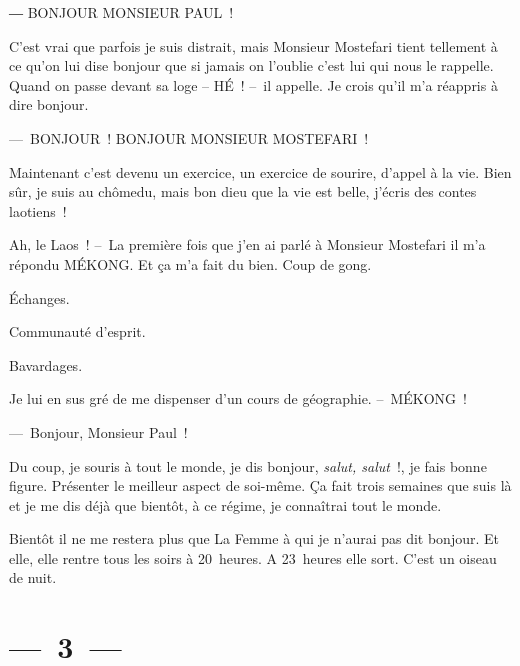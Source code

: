 \documentclass[french,twoside]{book} %
\begin{document}
― BONJOUR MONSIEUR PAUL !\par
C’est vrai que parfois je suis distrait, mais Monsieur Mostefari tient tellement à ce qu’on lui dise bonjour que si jamais on l’oublie c’est lui qui nous le rappelle. Quand on passe devant sa loge – HÉ ! – il appelle. Je crois qu’il m’a réappris à dire bonjour.\par
— BONJOUR ! BONJOUR MONSIEUR MOSTEFARI !\par
Maintenant c’est devenu un exercice, un exercice de sourire, d’appel à la vie. Bien sûr, je suis au chômedu, mais bon dieu que la vie est belle, j’écris des contes laotiens !\par
Ah, le Laos ! – La première fois que j’en ai parlé à Monsieur Mostefari il m’a répondu MÉKONG. Et ça m’a fait du bien. Coup de gong.\par
Échanges.\par
Communauté d’esprit.\par
Bavardages.\par
Je lui en sus gré de me dispenser d’un cours de géographie. – MÉKONG !\par
— Bonjour, Monsieur Paul !\par
Du coup, je souris à tout le monde, je dis bonjour, \emph{salut, salut} !, je fais bonne figure. Présenter le meilleur aspect de soi-même. Ça fait trois semaines que suis là et je me dis déjà que bientôt, à ce régime, je connaîtrai tout le monde.\par
Bientôt il ne me restera plus que La Femme à qui je n’aurai pas dit bonjour. Et elle, elle rentre tous les soirs à 20 heures. A 23 heures elle sort. C’est un oiseau de nuit.

\section[{— 3 —}]{— 3 —}
\renewcommand{\leftmark}{— 3 —}
\end{document}
